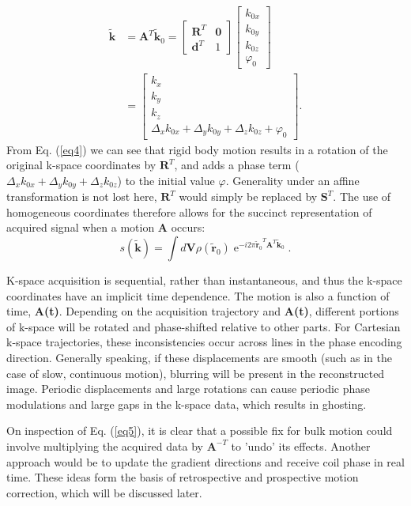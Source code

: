 \documentclass[class=article, crop=false]{standalone}
\begin{document}
\begin{equation} \label{eq4}
	\begin{split}
		\tilde{\textbf{k}} & = \textbf{A}^T\tilde{\textbf{k}}_0
		= \begin{bmatrix}\textbf{R}^T & \textbf{0} \\ \textbf{d}^T & 1\end{bmatrix}\begin{bmatrix}k_{0x}\\k_{0y}\\k_{0z}\\\varphi_0\end{bmatrix}\\
		& = \begin{bmatrix}k_{x}\\k_{y}\\k_{z}\\\Delta_{x}k_{0x} + \Delta_{y}k_{0y} + \Delta_{z}k_{0z} + \varphi_0\end{bmatrix}.
	\end{split}
\end{equation}
From Eq. (\ref{eq4}) we can see that rigid body motion results in a rotation of the original k-space coordinates by $\textbf{R}^T$, and adds a phase term ($\Delta_{x}k_{0x} + \Delta_{y}k_{0y} + \Delta_{z}k_{0z}$) to the initial value $\varphi$. Generality under an affine transformation is not lost here, $\textbf{R}^T$ would simply be replaced by $\textbf{S}^T$. The use of homogeneous coordinates therefore allows for the succinct representation of acquired signal when a motion \textbf{A} occurs:
\begin{equation} \label{eq5}
s(\tilde{\textbf{k}}) = \int d\textbf{V} \rho\left(\tilde{\textbf{r}}_0\right)\operatorname{e}^{-i2\pi{\tilde{\textbf{r}}_0}^{T}\textbf{A}^T\tilde{\textbf{k}}_0}.
\end{equation}
\par
K-space acquisition is sequential, rather than instantaneous, and thus the k-space coordinates have an implicit time dependence. The motion is also a function of time, \textbf{A(t)}. Depending on the acquisition trajectory and \textbf{A(t)}, different portions of k-space will be rotated and phase-shifted relative to other parts. For Cartesian k-space trajectories, these inconsistencies occur across lines in the phase encoding direction. Generally speaking, if these displacements are smooth (such as in the case of slow, continuous motion), blurring will be present in the reconstructed image. Periodic displacements and large rotations can cause periodic phase modulations and large gaps in the k-space data, which results in ghosting.
\par
On inspection of Eq. (\ref{eq5}), it is clear that a possible fix for bulk motion could involve multiplying the acquired data by $\textbf{A}^{-T}$ to 'undo' its effects. Another approach would be to update the gradient directions and receive coil phase in real time. These ideas form the basis of retrospective and prospective motion correction, which will be discussed later.
\end{document}
